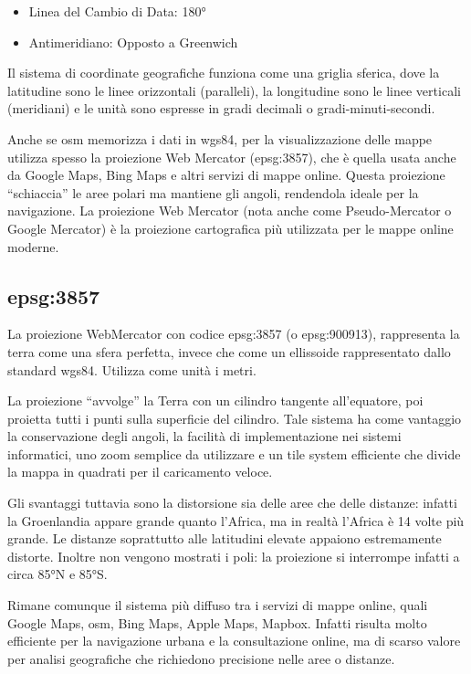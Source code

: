 \begin{itemize}
  \item Linea del Cambio di Data: 180°
  \item Antimeridiano: Opposto a Greenwich
\end{itemize}

Il sistema di coordinate geografiche funziona come una griglia sferica,
dove la latitudine sono le linee orizzontali (paralleli),
la longitudine sono le linee verticali (meridiani) e
le unità sono espresse in gradi decimali o gradi-minuti-secondi.

Anche se \acrfull{osm} memorizza i dati in \acrshort{wgs84}, per la visualizzazione delle mappe utilizza spesso
la proiezione Web Mercator (\acrshort{epsg}:3857), che è quella usata anche da Google Maps, Bing Maps e
altri servizi di mappe online. Questa proiezione ``schiaccia'' le aree polari ma mantiene gli angoli,
rendendola ideale per la navigazione. La proiezione Web Mercator (nota anche come Pseudo-Mercator o Google Mercator)
è la proiezione cartografica più utilizzata per le mappe online moderne.

\subsection{\acrshort{epsg}:3857}

La proiezione WebMercator con codice \acrshort{epsg}:3857 (o \acrshort{epsg}:900913), rappresenta la terra
come una sfera perfetta, invece che come un ellissoide rappresentato dallo standard \acrshort{wgs84}.
Utilizza come unità i metri.

La proiezione ``avvolge'' la Terra con un cilindro tangente all'equatore, poi proietta tutti i punti
sulla superficie del cilindro. Tale sistema ha come vantaggio la conservazione degli angoli, la facilità
di implementazione nei sistemi informatici, uno zoom semplice da utilizzare e un tile system efficiente
che divide la mappa in quadrati per il caricamento veloce.

Gli svantaggi tuttavia sono la distorsione sia delle aree che delle distanze: infatti la Groenlandia appare grande
quanto l'Africa, ma in realtà l'Africa è 14 volte più grande. Le distanze soprattutto alle latitudini elevate
appaiono estremamente distorte. Inoltre non vengono mostrati i poli: la proiezione si interrompe infatti
a circa 85°N e 85°S.

Rimane comunque il sistema più diffuso tra i servizi di mappe online, quali Google Maps, \acrfull{osm}, Bing Maps,
Apple Maps, Mapbox. Infatti risulta molto efficiente per la navigazione urbana e la consultazione online,
ma di scarso valore per analisi geografiche che richiedono precisione nelle aree o distanze.

